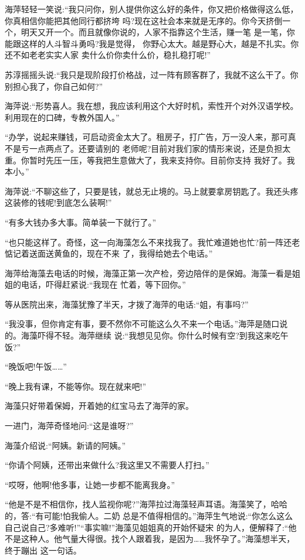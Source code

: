 \documentclass[11pt,a4paper,onecolumn]{article}
\begin{document}
海萍轻轻一笑说:``我只问你，别人提供你这么好的条件，你又把价格做得这么低，你真相信你能把其他同行都挤垮
吗?现在这社会本来就是无序的。你今天挤倒一个，明天又开一个。而且就像你说的，人家不指靠这个生活，赚一笔
是一笔，你能跟这样的人斗智斗勇吗?我是觉得， 你野心太大。越是野心大，越是不扎实。你还不如老老实实人家
卖什么价你卖什么价，稳扎稳打呢!''

苏淳摇摇头说:``我只是现阶段打价格战，过一阵有顾客群了，我就不这么干了。你别担心我了，你自己如何?''

海萍说:``形势喜人。我在想，我应该利用这个大好时机，索性开个对外汉语学校。利用现在的口碑，专教外国人。''

``办学，说起来赚钱，可启动资金太大了。租房子，打广告，万一没人来，那可真不是亏一点两点了。还要请别的
老师呢?目前对我们家的情形来说，还是负担太重。你暂时先压一压，等我把生意做大了，我来支持你。目前你支持
我好了。我本小。''

海萍说:``不聊这些了，只要是钱，就总无止境的。马上就要拿房钥匙了。我还头疼这装修的钱呢!到底怎么装啊!''

``有多大钱办多大事。简单装一下就行了。''

``也只能这样了。奇怪，这一向海藻怎么不来找我了。我忙难道她也忙?前一阵还老惦记着送面送黄鱼的，现在不来
了，我得给她去个电话。''

海萍给海藻去电话的时候，海藻正第一次产检，旁边陪伴的是保姆。海藻一看是姐姐的电话，吓得赶紧说:``我现在
忙着，等下回你。''

等从医院出来，海藻犹豫了半天，才拨了海萍的电话:``姐，有事吗?''

``我没事，但你肯定有事，要不然你不可能这么久不来一个电话。''海萍是随口说的。海藻吓得不轻。海萍继续
说:``我想见见你。你什么时候有空?到我这来吃午饭?''

``晚饭吧!午饭……''

``晚上我有课，不能等你。现在就来吧!''

海藻只好带着保姆，开着她的红宝马去了海萍的家。

一进门，海萍奇怪地问:``这是谁呀?''

海藻介绍说:``阿姨。新请的阿姨。''

``你请个阿姨，还带出来做什么?我这里又不需要人打扫。''

``哎呀，他啊!他多事，让她一步都不能离我身。''

``他是不是不相信你，找人监视你呢?''海萍拉过海藻轻声耳语。海藻笑了，哈哈的，答:``有可能!怕我偷人。二奶
总是不值得相信的。''海萍生气地说:``你怎么这么自己说自己?多难听!''``事实嘛!''海藻见姐姐真的开始怀疑宋
的为人，便解释了:``他不是这种人。他气量大得很。找个人跟着我，是因为……我怀孕了。''海藻想半天，终于蹦出
这一句话。
\end{document}
